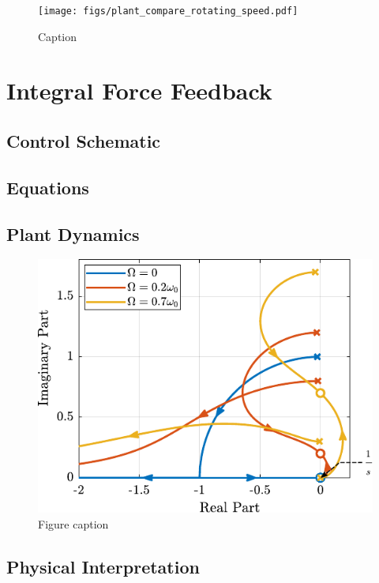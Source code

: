 \documentclass{ISMA_USD2020}
\begin{document}
\begin{figure}[htbp]
\centering
\texttt{[image: figs/plant\_compare\_rotating\_speed.pdf]}
\caption{\label{fig:plant_compare_rotating_speed}Caption}
\end{figure}

\section{Integral Force Feedback}
\label{sec:org78c2eab}
\subsection{Control Schematic}
\label{sec:org6a00238}

\subsection{Equations}
\label{sec:org5480f1b}

\subsection{Plant Dynamics}
\label{sec:orgbb0952e}

\begin{figure}[htbp]
\centering
\includegraphics[scale=1]{figs/root_locus_pure_iff.pdf}
\caption{\label{fig:root_locus_pure_iff}Figure caption}
\end{figure}

\subsection{Physical Interpretation}
\label{sec:orgdb25e2c}
\end{document}
